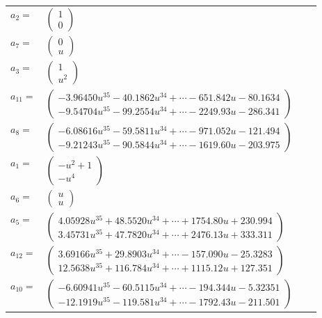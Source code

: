 \documentclass[1p]{elsarticle_modified}
\theoremstyle{definition}
\begin{document}
\begin{tabular}{m{7pt} m{180pt} m{7pt} m{180pt} }
\flushright $a_{2}=$&$\begin{pmatrix}1\\0\end{pmatrix}$ \\
\flushright $a_{7}=$&$\begin{pmatrix}0\\u\end{pmatrix}$ \\
\flushright $a_{3}=$&$\begin{pmatrix}1\\u^2\end{pmatrix}$ \\
\flushright $a_{11}=$&$\begin{pmatrix}-3.96450 u^{35}-40.1862 u^{34}+\cdots-651.842 u-80.1634\\-9.54704 u^{35}-99.2554 u^{34}+\cdots-2249.93 u-286.341\end{pmatrix}$ \\
\flushright $a_{8}=$&$\begin{pmatrix}-6.08616 u^{35}-59.5811 u^{34}+\cdots-971.052 u-121.494\\-9.21243 u^{35}-90.5844 u^{34}+\cdots-1619.60 u-203.975\end{pmatrix}$ \\
\flushright $a_{1}=$&$\begin{pmatrix}- u^2+1\\- u^4\end{pmatrix}$ \\
\flushright $a_{6}=$&$\begin{pmatrix}u\\u\end{pmatrix}$ \\
\flushright $a_{5}=$&$\begin{pmatrix}4.05928 u^{35}+48.5520 u^{34}+\cdots+1754.80 u+230.994\\3.45731 u^{35}+47.7820 u^{34}+\cdots+2476.13 u+333.311\end{pmatrix}$ \\
\flushright $a_{12}=$&$\begin{pmatrix}3.69166 u^{35}+29.8903 u^{34}+\cdots-157.090 u-25.3283\\12.5638 u^{35}+116.784 u^{34}+\cdots+1115.12 u+127.351\end{pmatrix}$ \\
\flushright $a_{10}=$&$\begin{pmatrix}-6.60941 u^{35}-60.5115 u^{34}+\cdots-194.344 u-5.32351\\-12.1919 u^{35}-119.581 u^{34}+\cdots-1792.43 u-211.501\end{pmatrix}$ \\

\end{tabular}
\end{document}
